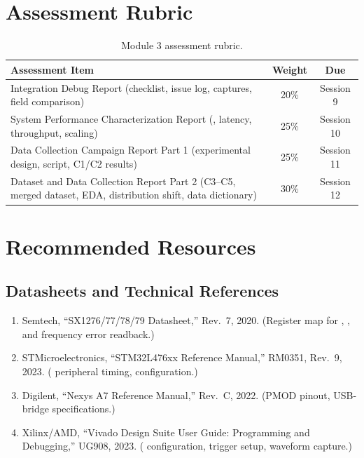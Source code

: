 \documentclass[11pt,letterpaper]{article}
\begin{document}
	\section{Assessment Rubric}

	\begin{table}[ht!]
		\centering
		\caption{Module 3 assessment rubric.}
		\label{tab:rubric}
		\renewcommand{\arraystretch}{1.3}
		\begin{tabularx}{\textwidth}{X c c}
			\toprule
			\textbf{Assessment Item} & \textbf{Weight} & \textbf{Due} \\
			\midrule
			Integration Debug Report (checklist, issue log, \ILA{} captures, field comparison) & 20\% & Session 9 \\
			System Performance Characterization Report (\PER{}, latency, throughput, scaling) & 25\% & Session 10 \\
			Data Collection Campaign Report Part 1 (experimental design, script, C1/C2 results) & 25\% & Session 11 \\
			Dataset and Data Collection Report Part 2 (C3--C5, merged dataset, EDA, distribution shift, data dictionary) & 30\% & Session 12 \\
			\bottomrule
		\end{tabularx}
	\end{table}

	\newpage
	\section{Recommended Resources}

	\subsection{Datasheets and Technical References}

	\begin{enumerate}[leftmargin=2em]
		\item Semtech, ``SX1276/77/78/79 Datasheet,'' Rev.\ 7, 2020. (Register map for \RSSI{}, \SNR{}, and frequency error readback.)
		\item STMicroelectronics, ``STM32L476xx Reference Manual,'' RM0351, Rev.\ 9, 2023. (\UART{} peripheral timing, \DMA{} configuration.)
		\item Digilent, ``Nexys A7 Reference Manual,'' Rev.\ C, 2022. (PMOD pinout, USB-\UART{} bridge specifications.)
		\item Xilinx/AMD, ``Vivado Design Suite User Guide: Programming and Debugging,'' UG908, 2023. (\ILA{} configuration, trigger setup, waveform capture.)
	\end{enumerate}
\end{document}
